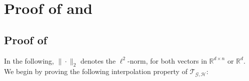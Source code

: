 \documentclass{article}
\begin{document}



\section{Proof of  and }

\subsection{Proof of }
\label{sec:proof_main}
In the following, $\|\cdot\|_2$ denotes the $\ell^2$-norm, for both  vectors in $\mathbb R^{d\times n}$ or  $\mathbb R^{d}$. We begin by proving the following interpolation property of $\mathcal{T}_{\mathcal{G}, \mathcal{H}}$:
\end{document}
